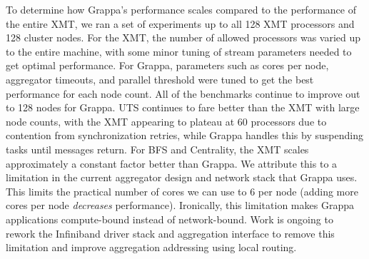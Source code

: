 %
%
To determine how Grappa's performance scales compared to the performance of the entire XMT, we ran a set of experiments up to all 128 XMT processors and 128 cluster nodes. For the XMT, the number of allowed processors was varied up to the entire machine, with some minor tuning of stream parameters needed to get optimal performance. For Grappa, parameters such as cores per node, aggregator timeouts, and parallel threshold were tuned to get the best performance for each node count. All of the benchmarks continue to improve out to 128 nodes for Grappa. UTS continues to fare better than the XMT with large node counts, with the XMT appearing to plateau at 60 processors due to contention from synchronization retries, while Grappa handles this by suspending tasks until messages return. For BFS and Centrality, the XMT scales approximately a constant factor better than Grappa. We attribute this to a limitation in the current aggregator design and network stack that Grappa uses.  This limits the practical number of cores we can use to 6 per node (adding more cores per node \emph{decreases} performance).  Ironically, this limitation makes Grappa applications compute-bound instead of network-bound.  Work is ongoing to rework the Infiniband driver stack and aggregation interface to remove this limitation and improve aggregation addressing using local routing.

